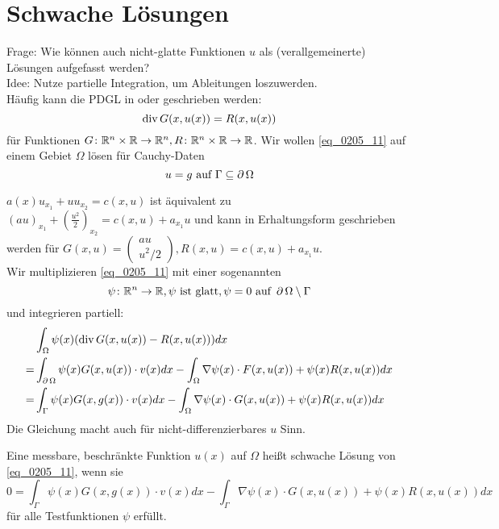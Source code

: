 \section{Schwache Lösungen}
\label{sec:para6}
Frage: Wie können auch nicht-glatte Funktionen $u$ als (verallgemeinerte) Lösungen aufgefasst werden?  \\
Idee: Nutze partielle Integration, um Ableitungen loszuwerden.\\
Häufig kann die PDGL in  oder  geschrieben werden:
\begin{equation}
	\operatorname{div} G(x,u(x)) = R(x,u(x)) \label{eq_0205_11}
\end{equation}
für Funktionen $G\colon \mathbb{R}^n \times \mathbb{R} \rightarrow \mathbb{R}^n, R\colon \mathbb{R}^n \times \mathbb{R} \rightarrow \mathbb{R}$. Wir wollen \eqref{eq_0205_11} auf einem Gebiet $\Omega$ lösen für Cauchy-Daten
\[u = g \text{ auf } \Gamma \subseteq \operatorname{\partial} \Omega \]

\begin{bsp} \label{bsp_15}
	$a(x)u_{x_1} + u u_{x_2} = c(x,u)$ ist äquivalent \marginnote{[15]} zu $(au)_{x_1} + \left( \frac{u^2}{2} \right)_{x_2} = c(x,u) + a_{x_1} u$ und kann in Erhaltungsform geschrieben werden für $G(x,u) = \begin{pmatrix} au \\ u^2/2 \end{pmatrix}, R(x,u) = c(x,u) + a_{x_1} u$. \\
	Wir multiplizieren \eqref{eq_0205_11} mit einer sogenannten 
	\[ \psi \colon \mathbb{R}^n \rightarrow \mathbb{R}, \psi \text{ ist glatt}, \psi = 0 \text{ auf } \operatorname{\partial} \Omega \setminus \Gamma \]
	und integrieren partiell:
	\begin{equation}
	\begin{aligned}
		&\int_\Omega \psi(x) (\operatorname{div} G(x,u(x)) - R(x,u(x))) dx \\ \notag
		= &\int_{\operatorname{\partial} \Omega} \psi(x) G(x,u(x)) \cdot v(x) dx - \int_\Omega \nabla \psi(x) \cdot F(x,u(x)) + \psi(x) R(x,u(x)) dx \\
		= &\int_\Gamma \psi(x) G(x,g(x)) \cdot v(x) dx - \int_\Omega \nabla \psi(x) \cdot G(x,u(x)) + \psi(x) R(x,u(x)) dx
	\end{aligned}
	\end{equation}
	Die Gleichung macht auch für nicht-differenzierbares $u$ Sinn.
\end{bsp}

\begin{defn}
\label{def_schwache_lsg} \label{def_16}
	Eine messbare, beschränkte Funktion $u(x)$ auf $\Omega$ heißt schwache Lösung von \eqref{eq_0205_11}, wenn sie \marginnote{[16]}
	\begin{equation}
		0 = \int_\Gamma \psi(x) G(x,g(x)) \cdot v(x) dx - \int_\Gamma \nabla \psi(x) \cdot G(x,u(x)) + \psi (x) R(x,u(x)) dx \label{eq_0205_12}
	\end{equation}
	für alle Testfunktionen $\psi$ erfüllt.
\end{defn}

